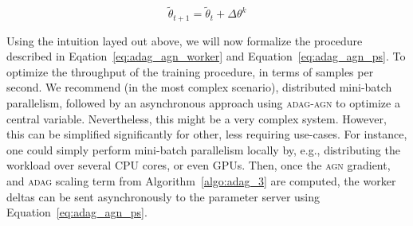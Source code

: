 \begin{equation}
  \label{eq:adag_agn_ps}
  \tilde{\theta}_{t+1} = \tilde{\theta}_t + \Delta\theta^k
\end{equation}

Using the intuition layed out above, we will now formalize the procedure described in Eqation~\ref{eq:adag_agn_worker} and Equation~\ref{eq:adag_agn_ps}. To optimize the throughput of the training procedure, in terms of samples per second. We recommend (in the most complex scenario), distributed mini-batch parallelism, followed by an asynchronous approach using \textsc{adag-agn} to optimize a central variable. Nevertheless, this might be a very complex system. However, this can be simplified significantly for other, less requiring use-cases. For instance, one could simply perform mini-batch parallelism locally by, e.g., distributing the workload over several CPU cores, or even GPUs. Then, once the \textsc{agn} gradient, and \textsc{adag} scaling term from Algorithm~\ref{algo:adag_3} are computed, the worker deltas can be sent asynchronously to the parameter server using Equation~\ref{eq:adag_agn_ps}.
